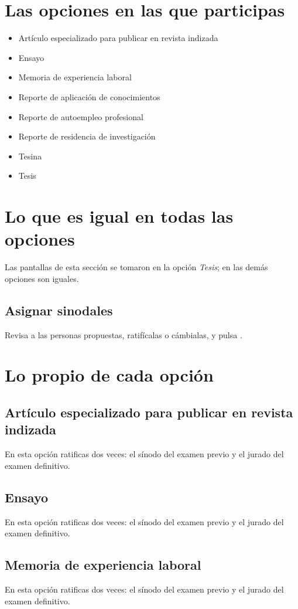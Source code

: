 \section{Las opciones en las que participas}
\begin{itemize}
  \item Artículo especializado para publicar en revista indizada
  \item Ensayo
  \item Memoria de experiencia laboral
  \item Reporte de aplicación de conocimientos
  \item Reporte de autoempleo profesional
  \item Reporte de residencia de investigación
  \item Tesina
  \item Tesis
\end{itemize}
\section{Lo que es igual en todas las opciones}
Las pantallas de esta sección se tomaron en la opción \emph{Tesis}; en las demás opciones son iguales.
\subsection{Asignar sinodales}
Revisa a las personas propuestas, ratifícalas o cámbialas, y pulsa .
\section{Lo propio de cada opción}
\subsection{Artículo especializado para publicar en revista indizada}
En esta opción ratificas dos veces: el sínodo del examen previo y el jurado del examen definitivo.
\subsection{Ensayo}
En esta opción ratificas dos veces: el sínodo del examen previo y el jurado del examen definitivo.
\subsection{Memoria de experiencia laboral}
En esta opción ratificas dos veces: el sínodo del examen previo y el jurado del examen definitivo.
